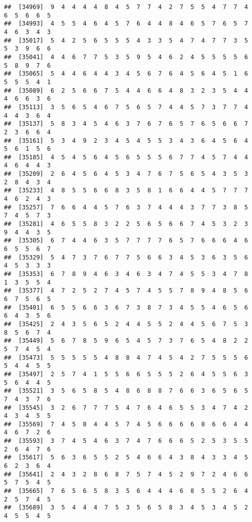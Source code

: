 \documentclass[
]{book}
\begin{document}
\begin{verbatim}
##  [34969]  9  4  4  4  4  8  4  5  7  7  4  2  7  5  5  4  7  7  4  6  5  6  6  5
##  [34993]  4  5  5  4  6  4  5  7  6  4  4  8  4  6  5  7  6  5  7  4  6  3  4  3
##  [35017]  5  4  2  5  6  5  5  5  4  3  3  5  4  7  4  7  7  3  5  5  3  9  6  6
##  [35041]  4  4  6  7  7  5  3  5  9  5  4  6  2  4  5  5  5  5  6  5  8  9  7  6
##  [35065]  5  4  4  6  4  4  3  4  5  6  7  6  4  5  6  4  5  1  6  5  5  5  4  1
##  [35089]  6  2  5  6  6  7  5  4  4  6  6  4  8  3  2  3  5  4  4  4  6  6  3  6
##  [35113]  3  5  6  5  4  6  7  5  6  5  7  4  4  5  7  3  7  7  4  4  4  3  6  4
##  [35137]  5  8  3  4  5  4  6  3  7  6  7  6  5  7  6  5  6  6  7  2  3  6  6  4
##  [35161]  5  3  4  9  2  3  4  5  4  5  5  3  4  3  6  4  5  6  4  5  6  1  5  6
##  [35185]  4  5  4  5  6  4  5  6  5  5  5  6  7  7  4  5  7  4  4  4  6  4  4  3
##  [35209]  2  6  4  5  6  4  5  3  4  7  6  7  5  6  5  4  3  5  3  2  8  4  3  4
##  [35233]  4  8  5  5  6  6  8  3  5  8  1  6  6  4  4  5  7  7  7  4  6  2  4  3
##  [35257]  7  6  6  4  4  5  7  6  3  7  4  4  4  3  7  7  3  8  5  7  4  5  7  3
##  [35281]  4  6  5  5  8  3  2  2  5  6  5  6  6  7  4  5  3  2  3  9  4  4  3  5
##  [35305]  6  7  4  4  6  3  5  7  7  7  7  6  5  7  6  6  6  4  6  6  5  5  6  7
##  [35329]  5  4  7  3  7  6  7  7  5  6  6  3  4  5  3  6  3  5  6  4  5  3  3  3
##  [35353]  6  7  8  9  4  6  3  4  6  3  4  7  4  5  5  3  4  7  8  1  3  5  5  4
##  [35377]  4  7  2  5  2  7  4  5  7  4  5  5  7  8  9  4  8  5  6  6  7  5  6  5
##  [35401]  6  5  5  6  6  3  6  7  3  8  7  3  4  5  5  4  6  5  6  6  4  3  5  6
##  [35425]  2  4  3  5  6  5  2  4  4  5  5  2  4  4  5  6  7  5  3  8  5  6  7  4
##  [35449]  5  6  7  8  5  9  6  5  4  5  7  3  7  6  5  4  8  2  2  5  7  4  5  4
##  [35473]  5  5  5  5  5  4  8  8  4  7  4  5  4  2  7  5  5  5  6  5  4  4  5  5
##  [35497]  2  5  7  4  1  5  5  6  6  5  5  5  2  6  4  5  5  6  3  5  6  4  4  5
##  [35521]  3  5  6  5  8  5  4  8  6  8  8  7  6  6  3  6  5  6  5  7  4  3  7  6
##  [35545]  3  2  6  7  7  7  5  4  7  6  4  6  5  5  3  4  7  4  2  4  3  4  5  5
##  [35569]  7  4  5  8  4  4  5  7  4  5  6  6  6  6  8  6  6  4  4  4  6  7  2  6
##  [35593]  3  7  4  5  4  6  3  7  4  7  6  6  6  5  2  5  3  5  5  2  6  4  7  6
##  [35617]  5  6  3  6  5  5  2  5  4  6  6  4  3  8  4  3  3  4  5  6  2  3  6  4
##  [35641]  2  4  3  2  8  6  8  7  5  7  4  5  2  9  7  2  4  6  6  5  7  5  4  5
##  [35665]  7  6  5  6  5  8  3  5  6  4  4  4  6  8  5  5  2  6  4  2  5  7  4  5
##  [35689]  3  5  4  4  4  7  5  3  5  6  5  8  3  4  5  3  4  5  2  4  5  5  4  5

\end{verbatim}
\end{document}
